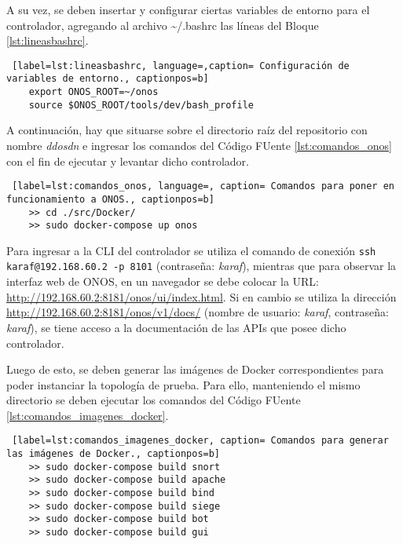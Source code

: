A su vez, se deben insertar y configurar ciertas variables de entorno para el controlador, agregando al archivo \textasciitilde{}/.bashrc las líneas del Bloque \ref{lst:lineasbashrc}.\\

\begin{lstlisting} [label=lst:lineasbashrc, language=,caption= Configuración de variables de entorno., captionpos=b]
    export ONOS_ROOT=~/onos
    source $ONOS_ROOT/tools/dev/bash_profile
\end{lstlisting}

A continuación, hay que situarse sobre el directorio raíz del repositorio con nombre \textit{ddosdn} e ingresar los comandos del Código FUente \ref{lst:comandos_onos} con el fin de ejecutar y levantar dicho controlador. \\

\begin{lstlisting} [label=lst:comandos_onos, language=, caption= Comandos para poner en funcionamiento a ONOS., captionpos=b]
    >> cd ./src/Docker/
    >> sudo docker-compose up onos
\end{lstlisting}



Para ingresar a la CLI del controlador se utiliza el comando
de conexión \texttt{ssh karaf@192.168.60.2 -p 8101} (contraseña: \textit{karaf}), mientras que para observar la interfaz web de ONOS, en un navegador se debe colocar la URL:
\url{http://192.168.60.2:8181/onos/ui/index.html}. Si en cambio se utiliza la dirección \url{http://192.168.60.2:8181/onos/v1/docs/} (nombre de usuario: \textit{karaf}, contraseña: \textit{karaf}), se tiene acceso a la documentación de las APIs que posee dicho controlador.


Luego de esto, se deben generar las imágenes de Docker correspondientes para poder instanciar la topología de prueba. Para ello, manteniendo el mismo directorio se deben ejecutar los comandos del Código FUente \ref{lst:comandos_imagenes_docker}.\\

\begin{lstlisting} [label=lst:comandos_imagenes_docker, caption= Comandos para generar las imágenes de Docker., captionpos=b]
    >> sudo docker-compose build snort
    >> sudo docker-compose build apache
    >> sudo docker-compose build bind
    >> sudo docker-compose build siege
    >> sudo docker-compose build bot
    >> sudo docker-compose build gui
\end{lstlisting}


